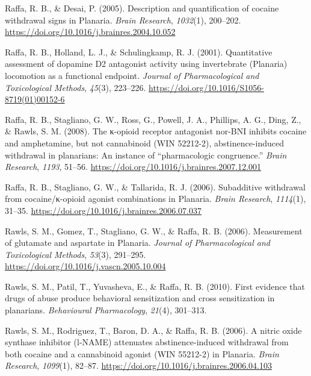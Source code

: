 \documentclass[
  jou,
  floatsintext,
  longtable,
  nolmodern,
  notxfonts,
  notimes,
  donotrepeattitle,
  colorlinks=true,linkcolor=blue,citecolor=blue,urlcolor=blue]{apa7}
\newlength{\cslhangindent}
\newenvironment{CSLReferences}[2] %
 {\begin{list}{}{%
  \setlength{\itemindent}{0pt}
  \setlength{\leftmargin}{0pt}
  \setlength{\parsep}{0pt}
  \ifodd #1
   \setlength{\leftmargin}{\cslhangindent}
   \setlength{\itemindent}{-1\cslhangindent}
  \fi
  \setlength{\itemsep}{#2\baselineskip}}}
 {\end{list}}
\begin{document}
\begin{CSLReferences}{1}{0}
Raffa, R. B., \& Desai, P. (2005). Description and quantification of
cocaine withdrawal signs in {Planaria}. \emph{Brain Research},
\emph{1032}(1), 200--202.
\url{https://doi.org/10.1016/j.brainres.2004.10.052}

Raffa, R. B., Holland, L. J., \& Schulingkamp, R. J. (2001).
Quantitative assessment of dopamine {D2} antagonist activity using
invertebrate ({Planaria}) locomotion as a functional endpoint.
\emph{Journal of Pharmacological and Toxicological Methods},
\emph{45}(3), 223--226.
\url{https://doi.org/10.1016/S1056-8719(01)00152-6}

Raffa, R. B., Stagliano, G. W., Ross, G., Powell, J. A., Phillips, A.
G., Ding, Z., \& Rawls, S. M. (2008). The κ-opioid receptor antagonist
nor-{BNI} inhibits cocaine and amphetamine, but not cannabinoid ({WIN}
52212-2), abstinence-induced withdrawal in planarians: {An} instance of
{``pharmacologic congruence.''} \emph{Brain Research}, \emph{1193},
51--56. \url{https://doi.org/10.1016/j.brainres.2007.12.001}

Raffa, R. B., Stagliano, G. W., \& Tallarida, R. J. (2006). Subadditive
withdrawal from cocaine/κ-opioid agonist combinations in {Planaria}.
\emph{Brain Research}, \emph{1114}(1), 31--35.
\url{https://doi.org/10.1016/j.brainres.2006.07.037}

Rawls, S. M., Gomez, T., Stagliano, G. W., \& Raffa, R. B. (2006).
Measurement of glutamate and aspartate in {Planaria}. \emph{Journal of
Pharmacological and Toxicological Methods}, \emph{53}(3), 291--295.
\url{https://doi.org/10.1016/j.vascn.2005.10.004}

Rawls, S. M., Patil, T., Yuvasheva, E., \& Raffa, R. B. (2010). First
evidence that drugs of abuse produce behavioral sensitization and cross
sensitization in planarians. \emph{Behavioural Pharmacology},
\emph{21}(4), 301--313.

Rawls, S. M., Rodriguez, T., Baron, D. A., \& Raffa, R. B. (2006). A
nitric oxide synthase inhibitor (l-{NAME}) attenuates abstinence-induced
withdrawal from both cocaine and a cannabinoid agonist ({WIN} 55212-2)
in {Planaria}. \emph{Brain Research}, \emph{1099}(1), 82--87.
\url{https://doi.org/10.1016/j.brainres.2006.04.103}


\end{CSLReferences}
\end{document}
